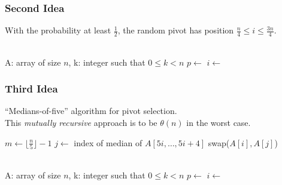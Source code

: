 \documentclass[12pt]{article}
\theoremstyle{definition}
\begin{document}
\subsubsection{Second Idea} \label{second-pivot}
With the probability at least $\frac{1}{2}$, the random pivot has position $\frac{n}{4} \leq i \leq \frac{3n}{4}$.
\begin{algorithmic}
  \State {}
  \EndFunction
\end{algorithmic}

\begin{algorithmic}
   \\
  A: array of size $n$, k: integer such that $0 \leq k < n$
  \State $p \leftarrow$ 
  \State $i \leftarrow$ 
    \State {}
    \State {}
    \State {}
  \EndIf
  \EndFunction
\end{algorithmic}

\subsubsection{Third Idea} \label{third-pivot}
``Medians-of-five'' algorithm for pivot selection. \\
This \emph{mutually recursive} approach is to be $\theta(n)$ in the worst case.
\begin{algorithmic}
  \State $m \leftarrow \lfloor\frac{n}{5}\rfloor - 1$
    \State $j \leftarrow$ index of median of $A[5i, \dots, 5i+4]$
    \State swap($A[i],A[j]$)
  \EndFor
  \State {}
  \EndFunction
\end{algorithmic}

\begin{algorithmic}
   \\
  A: array of size $n$, k: integer such that $0 \leq k < n$
  \State $p \leftarrow$ 
  \State $i \leftarrow$ 
    \State {}
    \State {}
    \State {}
  \EndIf
  \EndFunction
\end{algorithmic}
\end{document}
